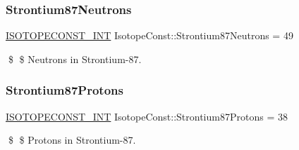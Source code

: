 \subsubsection{\texorpdfstring{Strontium87\+Neutrons}{Strontium87Neutrons}}
{\footnotesize\ttfamily \mbox{\hyperlink{group___isotope_const-_macros_ga5f18360b3e99483a35c32d789e62621c}{I\+S\+O\+T\+O\+P\+E\+C\+O\+N\+S\+T\+\_\+\+I\+NT}} Isotope\+Const\+::\+Strontium87\+Neutrons = 49}

\$ \$ Neutrons in Strontium-\/87. \mbox{\label{group___isotope_const-_strontium-_sr87_ga37bf020ad22e6fefc8a8ebdcb7a8d9ca}} 
\subsubsection{\texorpdfstring{Strontium87\+Protons}{Strontium87Protons}}
{\footnotesize\ttfamily \mbox{\hyperlink{group___isotope_const-_macros_ga5f18360b3e99483a35c32d789e62621c}{I\+S\+O\+T\+O\+P\+E\+C\+O\+N\+S\+T\+\_\+\+I\+NT}} Isotope\+Const\+::\+Strontium87\+Protons = 38}

\$ \$ Protons in Strontium-\/87. 